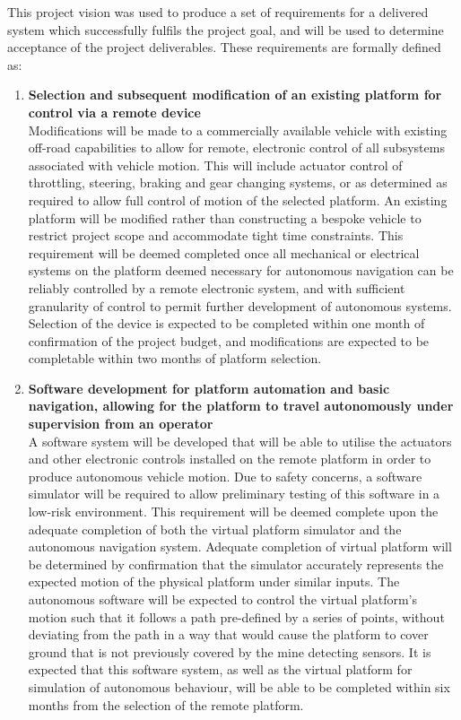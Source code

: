 \documentclass[main.tex]{subfiles}
\begin{document}
This project vision was used to produce a set of requirements for a delivered system which successfully fulfils the project goal, and will be used to determine acceptance of the project deliverables. 
These requirements are formally defined as:

\begin{enumerate}
\item \textbf{Selection and subsequent modification of an existing platform for control via a remote device}\\ 
Modifications will be made to a commercially available vehicle with existing off-road capabilities to allow for remote, electronic control of all subsystems associated with vehicle motion. This will include actuator control of throttling, steering, braking and gear changing systems, or as determined as required to allow full control of motion of the selected platform.
An existing platform will be modified rather than constructing a bespoke vehicle to restrict project scope and accommodate tight time constraints. 
This requirement will be deemed completed once all mechanical or electrical systems on the platform deemed necessary for autonomous navigation can be reliably controlled by a remote electronic system, and with sufficient granularity of control to permit further development of autonomous systems. 
Selection of the device is expected to be completed within one month of confirmation of the project budget, and modifications are expected to be completable within two months of platform selection. 

\item \textbf{Software development for platform automation and basic navigation, allowing for the platform to travel autonomously under supervision from an operator}\\ 
A software system will be developed that will be able to utilise the actuators and other electronic controls installed on the remote platform in order to produce autonomous vehicle motion. 
Due to safety concerns, a software simulator will be required to allow preliminary testing of this software in a low-risk environment. 
This requirement will be deemed complete upon the adequate completion of both the virtual platform simulator and the autonomous navigation system. 
Adequate completion of virtual platform will be determined by confirmation that the simulator accurately represents the expected motion of the physical platform under similar inputs. 
The autonomous software will be expected to control the virtual platform’s motion such that it follows a path pre-defined by a series of points, without deviating from the path in a way that would cause the platform to cover ground that is not previously covered by the mine detecting sensors. 
It is expected that this software system, as well as the virtual platform for simulation of autonomous behaviour, will be able to be completed within six months from the selection of the remote platform.


\end{enumerate}
\end{document}
